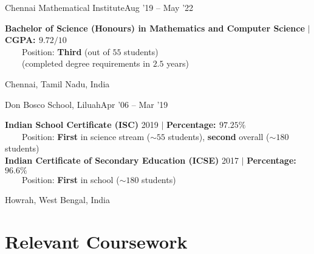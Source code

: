 \resumeSubheading
{Chennai Mathematical Institute}{Aug '19 -- May '22}
{\begin{minipage}{15cm} \color{grey}\textbf{Bachelor of Science (Honours) in Mathematics and Computer Science} $|$ \textbf{CGPA: $9.72/10$} \\
$\phantom{\qquad}$Position: \textbf{Third} (out of $55$ students)\\
$\phantom{\qquad}$(completed degree requirements in $2.5$ years) \end{minipage}
}{Chennai, Tamil Nadu, India}
\vspace{-5pt}
      
\resumeSubheading
{Don Bosco School, Liluah}{Apr '06 -- Mar '19}
{\begin{minipage}{15cm} \color{grey}\textbf{Indian School Certificate (ISC)} 2019 $|$ \textbf{Percentage: $97.25\%$} \\
$\phantom{\qquad}$Position: \textbf{First} in science stream ($\sim55$ students), \textbf{second} overall ($\sim180$ students) \\ 
\textbf{Indian Certificate of Secondary Education (ICSE)} 2017 $|$ \textbf{Percentage: $96.6\%$} \\
$\phantom{\qquad}$Position: \textbf{First} in school ($\sim180$ students) \end{minipage}
}{Howrah, West Bengal, India}
\vspace{-15pt}

\section{Relevant Coursework}

